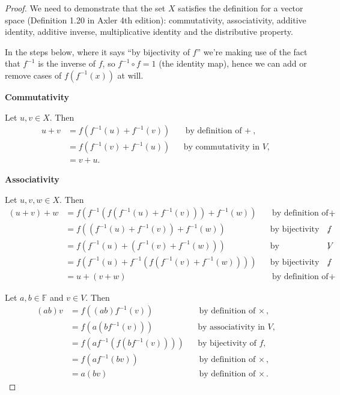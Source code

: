 \documentclass[10pt, a4paper]{article}
\newcommand{\defn}[1]{\textbf{\textsf{#1}}}
\def\F{\mathbb{F}}
\def\f{f}
\def\finv{f^{-1}}
\theoremstyle{break}
\begin{document}
\begin{proof}
We need to demonstrate that the set $X$ satisfies the definition for a vector space (Definition 1.20 in Axler 4th edition): commutativity, associativity, additive identity, additive inverse, multiplicative identity and the distributive property.

In the steps below, where it says ``by bijectivity of $\f$'' we're making use of the fact that $\finv$ is the inverse of $\f$, so $\finv \circ \f = 1$ (the identity map), hence we can add or remove cases of $\f(\finv(x))$ at will.

\defn{Commutativity}

Let $u, v \in X$. Then
\begin{align*}
u + v & = \f( \finv (u) + \finv(v)) && \text{by definition of $+$}, \\
      & = \f( \finv (v) + \finv(u)) && \text{by commutativity in $V$}, \\
      & = v + u.
\end{align*}

\defn{Associativity}

Let $u, v, w \in X$. Then
\begin{align*}
(u + v) + w & = \f( \finv( \f( \finv(u) + \finv(v))) + \finv(w)) && \text{by definition of $+$}, \\
            & = \f(( \finv(u) + \finv(v)) + \finv(w)) && \text{by bijectivity of $\f$}, \\
            & = \f( \finv(u) + ( \finv(v) + \finv(w))) && \text{by associativity in $V$}, \\
            & = \f( \finv(u) + \finv( \f( \finv(v) + \finv(w)))) && \text{by bijectivity of $\f$}, \\
            & = u + (v + w) && \text{by definition of $+$}.
\end{align*}

Let $a, b \in \F$ and $v \in V$. Then
\begin{align*}
(ab)v & = \f((ab) \finv(v)) && \text{by definition of $\times$}, \\
      & = \f(a (b \finv(v))) && \text{by associativity in $V$}, \\
      & = \f(a \finv( \f( b \finv(v)))) && \text{by bijectivity of $\f$}, \\
      & = \f(a \finv(bv)) && \text{by definition of $\times$}, \\
      & = a(bv) && \text{by definition of $\times$}.
\end{align*}


\end{proof}
\end{document}

